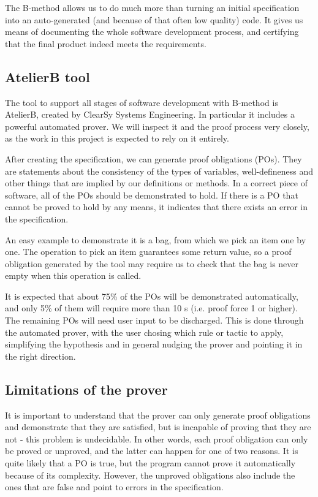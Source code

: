 \documentclass[11pt,journal]{IEEEtran}
\begin{document}
	The B-method allows us to do much more than turning an initial specification into an auto-generated (and because of that often low quality) code. It gives us means of documenting the whole software development process, and certifying that the final product indeed meets the requirements.
	
	\subsection{AtelierB tool}
	The tool to support all stages of software development with B-method is AtelierB, created by ClearSy Systems Engineering. In particular it includes a powerful automated prover. We will inspect it and the proof process very closely, as the work in this project is expected to rely on it entirely.
	
	After creating the specification, we can generate proof obligations (POs). They are statements about the consistency of the types of variables, well-defineness and other things that are implied by our definitions or methods. In a correct piece of software, all of the POs should be demonstrated to hold. If there is a PO that cannot be proved to hold by any means, it indicates that there exists an error in the specification.
	
	An easy example to demonstrate it is a bag, from which we pick an item one by one. The operation to pick an item guarantees some return value, so a proof obligation generated by the tool may require us to check that the bag is never empty when this operation is called.
	
	It is expected that about 75\% of the POs will be demonstrated automatically, and only 5\% of them will require more than 10 s (i.e. proof force 1 or higher)\cite{Prover guide}. The remaining POs will need user input to be discharged. This is done through the automated prover, with the user chosing which rule or tactic to apply, simplifying the hypothesis and in general nudging the prover and pointing it in the right direction.
	
	
	\subsection{Limitations of the prover}
	It is important to understand that the prover can only generate proof obligations and demonstrate that they are satisfied, but is incapable of proving that they are not - this problem is undecidable. In other words, each proof obligation can only be proved or unproved, and the latter can happen for one of two reasons. It is quite likely that a PO is true, but the program cannot prove it automatically because of its complexity. However, the unproved obligations also include the ones that are false and point to errors in the specification. 
	
\end{document}
